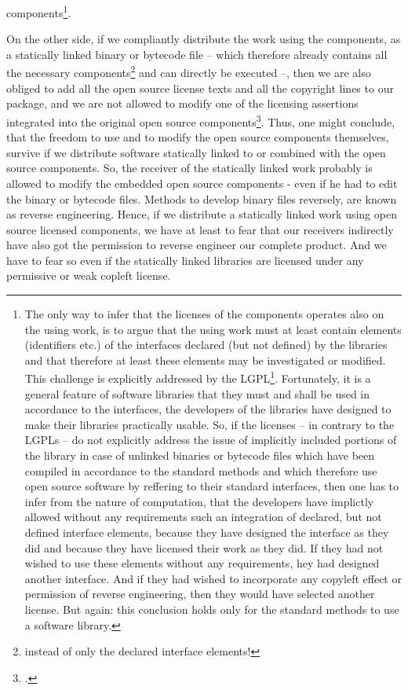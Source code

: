 components\footnote{The only way to infer that the licenses of the components
operates also on the using work, is to argue that the using work must at least
contain elements (identifiers etc.) of the interfaces declared (but not defined)
by the libraries and that therefore at least these elements may be investigated
or modified. This challenge is explicitly addressed by the
LGPL\footnote{$\rightarrow$ p.
\pageref{RevEngDistributeDynamicallyLinkedCode}}. Fortunately, it is a general
feature of software libraries that they must and shall be used in accordance to
the interfaces, the developers of the libraries have designed to make their
libraries practically usable. So, if the licenses -- in contrary to the LGPLs --
do not explicitly address the issue of implicitly included portions of the
library in case of unlinked binaries or bytecode files which have been compiled
in accordance to the standard methods and which therefore use open source
software by reffering to their standard interfaces, then one has to infer from
the nature of computation, that the developers have implictly allowed without
any requirements such an integration of declared, but not defined interface
elements, because they have designed the interface as they did and because they
have licensed their work as they did. If they had not wished to use these
elements without any requirements, hey had designed another interface. And if
they had wished to incorporate any copyleft effect or permission of reverse
engineering, then they would have selected another license. But again: this
conclusion holds only for the standard methods to use a software library.}.

On the other side, if we compliantly distribute the work using the components,
as a statically linked binary or bytecode file -- which therefore already
contains all the necessary components\footnote{instead of only the declared
interface elements!} and can directly be executed --, then we are also obliged
to add all the open source license texts and all the copyright lines to our
package, and we are not allowed to modify one of the licensing assertions
integrated into the original open source components\footcite[cf.][chapter
6.]{Reincke2015a}. Thus, one might conclude, that the freedom to use and to
modify the open source components themselves, survive if we distribute software
statically linked to or combined with the open source components. So, the
receiver of the statically linked work probably is allowed to modify the
embedded open source components - even if he had to edit the binary or bytecode
files. Methods to develop binary files reversely, are known as reverse
engineering. Hence, if we distribute a statically linked work using open source
licensed components, we have at least to fear that our receivers indirectly have
also got the permission to reverse engineer our complete product. And we have to
fear so even if the statically linked libraries are licensed under any
permissive or weak copleft license.

